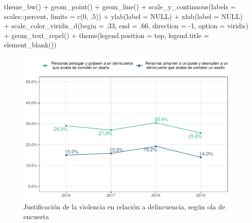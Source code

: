\documentclass[
  12pt,
]{book}
\newenvironment{Shaded}{\begin{snugshade}}{\end{snugshade}}
\newcommand{\AttributeTok}[1]{\textcolor[rgb]{0.77,0.63,0.00}{#1}}
\newcommand{\ConstantTok}[1]{\textcolor[rgb]{0.00,0.00,0.00}{#1}}
\newcommand{\DecValTok}[1]{\textcolor[rgb]{0.00,0.00,0.81}{#1}}
\newcommand{\FunctionTok}[1]{\textcolor[rgb]{0.00,0.00,0.00}{#1}}
\newcommand{\NormalTok}[1]{#1}
\newcommand{\SpecialCharTok}[1]{\textcolor[rgb]{0.00,0.00,0.00}{#1}}
\newcommand{\StringTok}[1]{\textcolor[rgb]{0.31,0.60,0.02}{#1}}
\begin{document}
\begin{Shaded}
\begin{Highlighting}[]
  \FunctionTok{theme\_bw}\NormalTok{() }\SpecialCharTok{+} 
  \FunctionTok{geom\_point}\NormalTok{() }\SpecialCharTok{+} 
  \FunctionTok{geom\_line}\NormalTok{() }\SpecialCharTok{+} 
  \FunctionTok{scale\_y\_continuous}\NormalTok{(}\AttributeTok{labels =}\NormalTok{ scales}\SpecialCharTok{::}\NormalTok{percent,}
                     \AttributeTok{limits =} \FunctionTok{c}\NormalTok{(}\DecValTok{0}\NormalTok{, .}\DecValTok{5}\NormalTok{)) }\SpecialCharTok{+}
  \FunctionTok{ylab}\NormalTok{(}\AttributeTok{label =} \ConstantTok{NULL}\NormalTok{) }\SpecialCharTok{+}
  \FunctionTok{xlab}\NormalTok{(}\AttributeTok{label =} \ConstantTok{NULL}\NormalTok{) }\SpecialCharTok{+}
  \FunctionTok{scale\_color\_viridis\_d}\NormalTok{(}\AttributeTok{begin =}\NormalTok{ .}\DecValTok{33}\NormalTok{, }\AttributeTok{end =}\NormalTok{ .}\DecValTok{66}\NormalTok{, }\AttributeTok{direction =} \SpecialCharTok{{-}}\DecValTok{1}\NormalTok{, }\AttributeTok{option =} \StringTok{\textquotesingle{}viridis\textquotesingle{}}\NormalTok{) }\SpecialCharTok{+} 
  \FunctionTok{geom\_text\_repel}\NormalTok{() }\SpecialCharTok{+}
  \FunctionTok{theme}\NormalTok{(}\AttributeTok{legend.position =} \StringTok{\textquotesingle{}top\textquotesingle{}}\NormalTok{,}
        \AttributeTok{legend.title =} \FunctionTok{element\_blank}\NormalTok{())}
\end{Highlighting}
\end{Shaded}

\begin{figure}
\centering
\includegraphics{reporte-elsoc_files/figure-latex/just-vio-ola-1.pdf}
\caption{\label{fig:just-vio-ola}Justificación de la violencia en relación a delincuencia, según ola de encuesta}
\end{figure}
\end{document}
